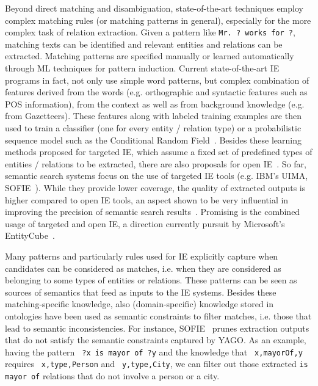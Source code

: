 Beyond direct matching and disambiguation, state-of-the-art techniques employ complex matching rules (or matching patterns in general), especially for the more complex task of relation extraction. Given a pattern like \verb+Mr. ? works for ?+, matching texts can be identified and relevant entities and relations can be extracted. Matching patterns are specified manually or learned automatically through ML techniques for pattern induction. Current state-of-the-art IE programs in fact, not only use simple word patterns, but complex combination of features derived from the words (e.g. orthographic 
and syntactic features such as POS information), from the context 
as well as from background knowledge (e.g. from Gazetteers). These features along with labeled training examples are then used to train a classifier (one for every entity / relation type) or a probabilistic sequence model such as the Conditional Random Field~\cite{DBLP:conf/icml/ZhuNWZM05}. Besides these learning methods proposed for targeted IE, which assume a fixed set of predefined types of entities / relations to be extracted, there are also proposals for open IE~\cite{DBLP:conf/ijcai/EtzioniFCSM11}. So far, semantic search systems focus on the use of targeted IE tools (e.g. IBM's UIMA, SOFIE~\cite{DBLP:conf/www/SuchanekSW09}). While they provide lower coverage, the quality of extracted outputs is higher compared to open IE tools, an aspect shown to be very influential in improving the precision of semantic search results~\cite{DBLP:conf/sigir/Chu-CarrollPCFD06,DBLP:conf/cikm/Chu-CarrollP07}. Promising is the combined usage of targeted and open IE, a direction currently pursuit by Microsoft's EntityCube~\cite{DBLP:conf/www/ZhuNLZW09}.  

Many patterns and particularly rules used for IE explicitly capture when candidates can be considered as matches, i.e. when they are considered as belonging to some types of entities or relations. These patterns can be seen as sources of semantics that feed as inputs to the IE systems. Besides these matching-specific knowledge, also 
(domain-specific) knowledge stored in ontologies have been used as semantic constraints to filter matches, i.e. those that lead to semantic inconsistencies. For instance, SOFIE~\cite{DBLP:conf/www/SuchanekSW09} prunes extraction outputs that do not satisfy the semantic constraints captured by YAGO. As an example, having the pattern \verb+ ?x is mayor of ?y+ and the knowledge that \verb+ x,mayorOf,y+ requires \verb+ x,type,Person+ and \verb+ y,type,City+, we can filter out those extracted \verb+is mayor of+ relations that do not involve a person or a city. 


